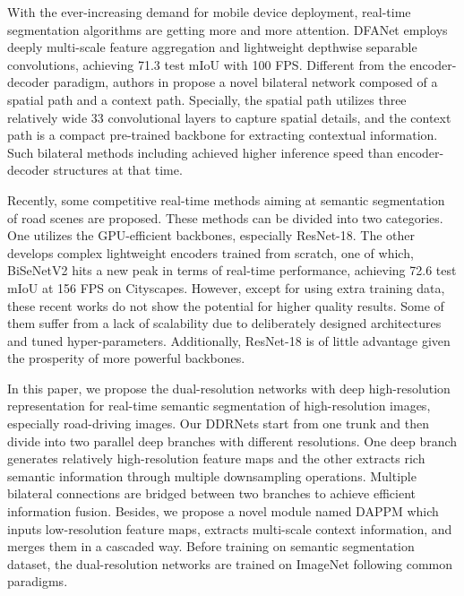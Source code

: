 \documentclass[journal]{IEEEtran}
\begin{document}
With the ever-increasing demand for mobile device deployment, real-time segmentation algorithms\cite{paszke2016enet,9040271,zhao2018icnet,mehta2018espnet,9032321} are getting more and more attention. DFANet\cite{li2019dfanet} employs deeply multi-scale feature aggregation and lightweight depthwise separable convolutions, achieving 71.3 test mIoU with 100 FPS. Different from the encoder-decoder paradigm,
authors in \cite{yu2018bisenet} propose a novel bilateral network composed of a spatial path and a context path. Specially, the spatial path utilizes three relatively wide 33 convolutional layers to capture spatial details, and the context path is a compact pre-trained backbone for extracting contextual information. Such bilateral methods including \cite{poudel2019fast} achieved higher inference speed than encoder-decoder structures at that time.

Recently, some competitive real-time methods aiming at semantic segmentation of road scenes are proposed. These methods can be divided into two categories. One utilizes the GPU-efficient backbones, especially ResNet-18\cite{orsic2019defense,hu2020real,li2020semantic}. The other develops complex lightweight encoders trained from scratch, one of which, BiSeNetV2\cite{yu2020bisenet} hits a new peak in terms of real-time performance, achieving 72.6 test mIoU at 156 FPS on Cityscapes. However, except for \cite{li2020semantic} using extra training data, these recent works do not show the potential for higher quality results. Some of them suffer from a lack of scalability due to deliberately designed architectures and tuned hyper-parameters. Additionally, ResNet-18 is of little advantage given the prosperity of more powerful backbones.

In this paper, we propose the dual-resolution networks with deep high-resolution representation for real-time semantic segmentation of high-resolution images, especially road-driving images. Our DDRNets start from one trunk and then divide into two parallel deep branches with different resolutions. One deep branch generates relatively high-resolution feature maps and the other extracts rich semantic information through multiple downsampling operations. Multiple bilateral connections are bridged between two branches to achieve efficient information fusion. Besides, we propose a novel module named DAPPM which inputs low-resolution feature maps, extracts multi-scale context information, and merges them in a cascaded way. Before training on semantic segmentation dataset, the dual-resolution networks are trained on ImageNet following common paradigms.
\end{document}
